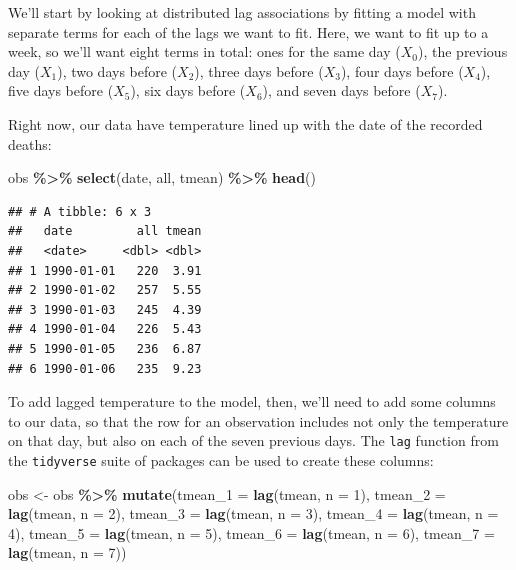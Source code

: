 \documentclass[
]{book}
\newenvironment{Shaded}{\begin{snugshade}}{\end{snugshade}}
\newcommand{\AttributeTok}[1]{\textcolor[rgb]{0.13,0.29,0.53}{#1}}
\newcommand{\DecValTok}[1]{\textcolor[rgb]{0.00,0.00,0.81}{#1}}
\newcommand{\FunctionTok}[1]{\textcolor[rgb]{0.13,0.29,0.53}{\textbf{#1}}}
\newcommand{\NormalTok}[1]{#1}
\newcommand{\OtherTok}[1]{\textcolor[rgb]{0.56,0.35,0.01}{#1}}
\newcommand{\SpecialCharTok}[1]{\textcolor[rgb]{0.81,0.36,0.00}{\textbf{#1}}}
\begin{document}
We'll start by looking at distributed lag associations by fitting a model with
separate terms for each of the lags we want to fit. Here, we want to fit up to
a week, so we'll want eight terms in total: ones for the same day (\(X_0\)), the
previous day (\(X_1\)), two days before (\(X_2\)), three days before (\(X_3\)),
four days before (\(X_4\)), five days before (\(X_5\)), six days before (\(X_6\)),
and seven days before (\(X_7\)).

Right now, our data have temperature lined up with the date of the recorded deaths:

\begin{Shaded}
\begin{Highlighting}[]
\NormalTok{obs }\SpecialCharTok{\%\textgreater{}\%} 
  \FunctionTok{select}\NormalTok{(date, all, tmean) }\SpecialCharTok{\%\textgreater{}\%} 
  \FunctionTok{head}\NormalTok{()}
\end{Highlighting}
\end{Shaded}

\begin{verbatim}
## # A tibble: 6 x 3
##   date         all tmean
##   <date>     <dbl> <dbl>
## 1 1990-01-01   220  3.91
## 2 1990-01-02   257  5.55
## 3 1990-01-03   245  4.39
## 4 1990-01-04   226  5.43
## 5 1990-01-05   236  6.87
## 6 1990-01-06   235  9.23
\end{verbatim}

To add lagged temperature to the model, then, we'll need to add some columns to our
data, so that the row for an observation includes not only the temperature on that
day, but also on each of the seven previous days. The \texttt{lag} function from the \texttt{tidyverse}
suite of packages can be used to create these columns:

\begin{Shaded}
\begin{Highlighting}[]
\NormalTok{obs }\OtherTok{\textless{}{-}}\NormalTok{ obs }\SpecialCharTok{\%\textgreater{}\%} 
  \FunctionTok{mutate}\NormalTok{(}\AttributeTok{tmean\_1 =} \FunctionTok{lag}\NormalTok{(tmean, }\AttributeTok{n =} \DecValTok{1}\NormalTok{), }
         \AttributeTok{tmean\_2 =} \FunctionTok{lag}\NormalTok{(tmean, }\AttributeTok{n =} \DecValTok{2}\NormalTok{), }
         \AttributeTok{tmean\_3 =} \FunctionTok{lag}\NormalTok{(tmean, }\AttributeTok{n =} \DecValTok{3}\NormalTok{), }
         \AttributeTok{tmean\_4 =} \FunctionTok{lag}\NormalTok{(tmean, }\AttributeTok{n =} \DecValTok{4}\NormalTok{), }
         \AttributeTok{tmean\_5 =} \FunctionTok{lag}\NormalTok{(tmean, }\AttributeTok{n =} \DecValTok{5}\NormalTok{), }
         \AttributeTok{tmean\_6 =} \FunctionTok{lag}\NormalTok{(tmean, }\AttributeTok{n =} \DecValTok{6}\NormalTok{), }
         \AttributeTok{tmean\_7 =} \FunctionTok{lag}\NormalTok{(tmean, }\AttributeTok{n =} \DecValTok{7}\NormalTok{))}
\end{Highlighting}
\end{Shaded}
\end{document}
